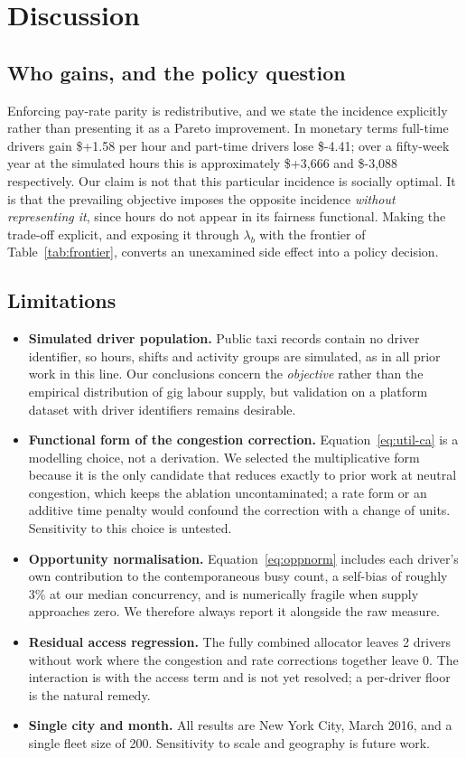 \documentclass[10pt,twocolumn]{article}
\begin{document}
\section{Discussion}
\subsection{Who gains, and the policy question}
Enforcing pay-rate parity is redistributive, and we state the incidence explicitly rather than presenting it as a Pareto improvement. In monetary terms full-time drivers gain \$+1.58 per hour and part-time drivers lose \$-4.41; over a fifty-week year at the simulated hours this is approximately \$+3,666 and \$-3,088 respectively. Our claim is not that this particular incidence is socially optimal. It is that the prevailing objective imposes the opposite incidence \emph{without representing it}, since hours do not appear in its fairness functional. Making the trade-off explicit, and exposing it through \(\lambda_b\) with the frontier of Table~\ref{tab:frontier}, converts an unexamined side effect into a policy decision.

\subsection{Limitations}
\begin{itemize}
\itemsep2pt
  \item \textbf{Simulated driver population.} Public taxi records contain no driver identifier, so hours, shifts and activity groups are simulated, as in all prior work in this line. Our conclusions concern the \emph{objective} rather than the empirical distribution of gig labour supply, but validation on a platform dataset with driver identifiers remains desirable.
  \item \textbf{Functional form of the congestion correction.} Equation~\ref{eq:util-ca} is a modelling choice, not a derivation. We selected the multiplicative form because it is the only candidate that reduces exactly to prior work at neutral congestion, which keeps the ablation uncontaminated; a rate form or an additive time penalty would confound the correction with a change of units. Sensitivity to this choice is untested.
  \item \textbf{Opportunity normalisation.} Equation~\ref{eq:oppnorm} includes each driver's own contribution to the contemporaneous busy count, a self-bias of roughly 3\% at our median concurrency, and is numerically fragile when supply approaches zero. We therefore always report it alongside the raw measure.
  \item \textbf{Residual access regression.} The fully combined allocator leaves 2 drivers without work where the congestion and rate corrections together leave 0. The interaction is with the access term and is not yet resolved; a per-driver floor is the natural remedy.
  \item \textbf{Single city and month.} All results are New York City, March 2016, and a single fleet size of 200. Sensitivity to scale and geography is future work.
\end{itemize}
\end{document}
